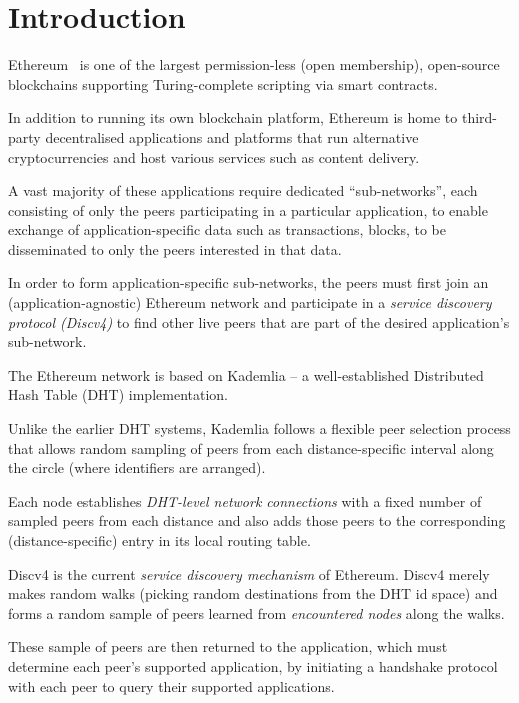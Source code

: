
\section{Introduction}
Ethereum~\cite{buterin2013ethereum}  is one of the largest permission-less (\ie open membership),  open-source  blockchains supporting Turing-complete scripting via smart contracts. 

In addition to running its own blockchain platform, Ethereum is home to third-party decentralised applications and platforms that run alternative cryptocurrencies and host various services such as content delivery. 

A vast majority of these applications require dedicated ``sub-networks'', each consisting of only the peers participating in a particular application, to enable exchange of application-specific data such as transactions, blocks, \etc to be disseminated to only the peers interested in that data. 

In order to form application-specific sub-networks, the peers must first join an (application-agnostic) Ethereum network and participate in a \textit{service discovery protocol (Discv4)} to find other live peers that are part of the desired application's sub-network. 

The Ethereum network is based on Kademlia\cite{maymounkov2002kademlia} – a well-established Distributed Hash Table (DHT) implementation. 

Unlike the earlier DHT systems, Kademlia follows a flexible peer selection process that allows random sampling of peers from each distance-specific interval along the circle (where identifiers are arranged). 

Each node establishes \textit{DHT-level network connections} with a fixed number of sampled peers from each distance and also adds those peers to the corresponding (distance-specific) entry in its local routing table.

 Discv4 is the current \textit{service discovery mechanism} of Ethereum. Discv4 merely makes random walks (picking random destinations from the DHT id space) and forms a random sample of peers learned from \textit{encountered nodes} along the walks. 

These sample of peers are then returned to the application, which must determine each peer's supported application, \ie by initiating a handshake protocol with each peer to query their supported applications. 

